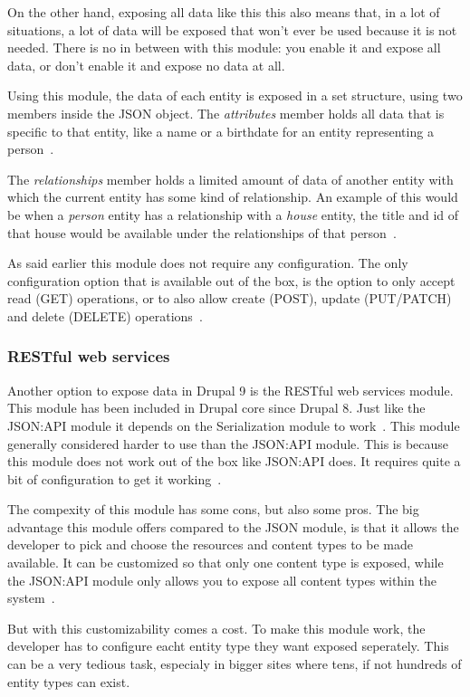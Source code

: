 On the other hand, exposing all data like this this also means that, in a lot of situations, a lot of data will be exposed that won't ever be used because it is not needed. There is no in between with this module: you enable it and expose all data, or don't enable it and expose no data at all.

Using this module, the data of each entity is exposed in a set structure, using two members inside the JSON object. The \emph{attributes} member holds all data that is specific to that entity, like a name or a birthdate for an entity representing a person~\autocite{Drupal2019}. 

The \emph{relationships} member holds a limited amount of data of another entity with which the current entity has some kind of relationship. An example of this would be when a \emph{person} entity has a relationship with a \emph{house} entity, the title and id of that house would be available under the relationships of that person~\autocite{Drupal2019}.

As said earlier this module does not require any configuration. The only configuration option that is available out of the box, is the option to only accept read (GET) operations, or to also allow create (POST), update (PUT/PATCH) and delete (DELETE) operations~\autocite{So2018}.


\subsubsection{RESTful web services}

Another option to expose data in Drupal 9 is the RESTful web services module. This module has been included in Drupal core since Drupal 8. Just like the JSON:API module it depends on the Serialization module to work~\autocite{Drupal2018}.
This module generally considered harder to use than the JSON:API module. This is because this module does not work out of the box like JSON:API does. It requires quite a bit of configuration to get it working~\autocite{Drupal2018}.

The compexity of this module has some cons, but also some pros. The big advantage this module offers compared to the JSON module, is that it allows the developer to pick and choose the resources and content types to be made available. It can be customized so that only one content type is exposed, while the JSON:API module only allows you to expose all content types within the system~\autocite{So2018}. 

But with this customizability comes a cost. To make this module work, the developer has to configure eacht entity type they want exposed seperately. This can be a very tedious task, especialy in bigger sites where tens, if not hundreds of entity types can exist.

